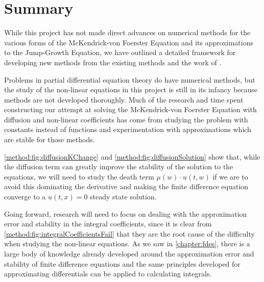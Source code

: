 \documentclass[../main.tex]{subfiles}
\begin{document}
  \section{Summary}

  While this project has not made direct advances on numerical methods for the various forms of the McKendrick-von Foerster Equation and its approximations to the Jump-Growth Equation, we have outlined a detailed framework for developing new methods from the existing methods and the work of \cite{hartvig2011}.

  Problems in partial differential equation theory do have numerical methods, but the study of the non-linear equations in this project is still in its infancy because methods are not developed thoroughly. Much of the research and time spent constructing our attempt at solving the McKendrick-von Foerster Equation with diffusion and non-linear coefficients has come from studying the problem with constants instead of functions and experimentation with approximations which are stable for those methods.

  \autoref{method:fig:diffusionKChange} and \autoref{method:fig:diffusionSolution} show that, while the diffusion term can greatly improve the stability of the solution to the equations, we will need to study the death term $\mu(w) \cdot u(t, w)$ if we are to avoid this dominating the derivative and making the finite difference equation converge to a $u(t, x) = 0$ steady state solution.

  Going forward, research will need to focus on dealing with the approximation error and stability in the integral coefficients, since it is clear from \autoref{method:fig:integralCoefficientsFail} that they are the root cause of the difficulty when studying the non-linear equations. As we saw in \autoref{chapter:fdes}, there is a large body of knowledge already developed around the approximation error and stability of finite difference equations and the same principles developed for approximating differentials can be applied to calculating integrals.
\end{document}
